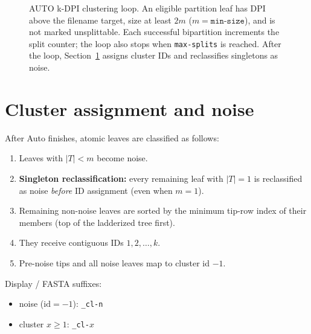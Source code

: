 \documentclass[11pt,a4paper]{article}
\begin{document}
\begin{figure}[htbp]
\caption{AUTO k-DPI clustering loop.
  An eligible partition leaf has DPI above the filename target, size at least
  $2m$ ($m=\texttt{min-size}$), and is not marked unsplittable.
  Each successful bipartition increments the split counter; the loop also stops
  when \texttt{max-splits} is reached.
  After the loop, Section~\ref{sec:assign} assigns cluster IDs and reclassifies
  singletons as noise.}
\label{fig:kdpi-auto}
\end{figure}

\section{Cluster assignment and noise}
\label{sec:assign}

After Auto finishes, atomic leaves are classified as follows:
\begin{enumerate}
  \item Leaves with $|T|<m$ become noise.
  \item \textbf{Singleton reclassification:} every remaining leaf with $|T|=1$
        is reclassified as noise \emph{before} ID assignment
        (even when $m=1$).
  \item Remaining non-noise leaves are sorted by the minimum tip-row index of
        their members (top of the ladderized tree first).
  \item They receive contiguous IDs $1,2,\ldots,k$.
  \item Pre-noise tips and all noise leaves map to cluster id $-1$.
\end{enumerate}
Display / FASTA suffixes:
\begin{itemize}[nosep]
  \item noise ($\mathrm{id}=-1$): \texttt{\_cl-n}
  \item cluster $x\ge 1$: \texttt{\_cl-}$x$
\end{itemize}

\end{document}

